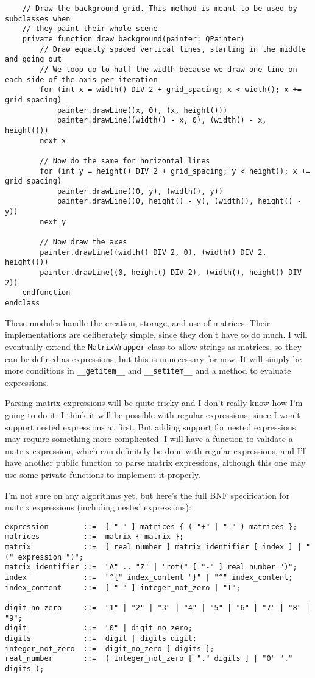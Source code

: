 \documentclass[../main.tex]{subfiles}
\begin{document}
\begin{verbatim}
	// Draw the background grid. This method is meant to be used by subclasses when
	// they paint their whole scene
	private function draw_background(painter: QPainter)
		// Draw equally spaced vertical lines, starting in the middle and going out
		// We loop uo to half the width because we draw one line on each side of the axis per iteration
		for (int x = width() DIV 2 + grid_spacing; x < width(); x += grid_spacing)
			painter.drawLine((x, 0), (x, height()))
			painter.drawLine((width() - x, 0), (width() - x, height()))
		next x

		// Now do the same for horizontal lines
		for (int y = height() DIV 2 + grid_spacing; y < height(); x += grid_spacing)
			painter.drawLine((0, y), (width(), y))
			painter.drawLine((0, height() - y), (width(), height() - y))
		next y

		// Now draw the axes
		painter.drawLine((width() DIV 2, 0), (width() DIV 2, height()))
		painter.drawLine((0, height() DIV 2), (width(), height() DIV 2))
	endfunction
endclass
\end{verbatim}

These modules handle the creation, storage, and use of matrices. Their implementations are deliberately simple, since they don't have to do much. I will eventually extend the \texttt{MatrixWrapper} class to allow strings as matrices, so they can be defined as expressions, but this is unnecessary for now. It will simply be more conditions in \texttt{__getitem__} and \texttt{__setitem__} and a method to evaluate expressions.

Parsing matrix expressions will be quite tricky and I don't really know how I'm going to do it. I think it will be possible with regular expressions, since I won't support nested expressions at first. But adding support for nested expressions may require something more complicated. I will have a function to validate a matrix expression, which can definitely be done with regular expressions, and I'll have another public function to parse matrix expressions, although this one may use some private functions to implement it properly.

I'm not sure on any algorithms yet, but here's the full BNF specification for matrix expressions (including nested expressions):

\begin{verbatim}
expression        ::=  [ "-" ] matrices { ( "+" | "-" ) matrices };
matrices          ::=  matrix { matrix };
matrix            ::=  [ real_number ] matrix_identifier [ index ] | "(" expression ")";
matrix_identifier ::=  "A" .. "Z" | "rot(" [ "-" ] real_number ")";
index             ::=  "^{" index_content "}" | "^" index_content;
index_content     ::=  [ "-" ] integer_not_zero | "T";

digit_no_zero     ::=  "1" | "2" | "3" | "4" | "5" | "6" | "7" | "8" | "9";
digit             ::=  "0" | digit_no_zero;
digits            ::=  digit | digits digit;
integer_not_zero  ::=  digit_no_zero [ digits ];
real_number       ::=  ( integer_not_zero [ "." digits ] | "0" "." digits );
\end{verbatim}
\end{document}
